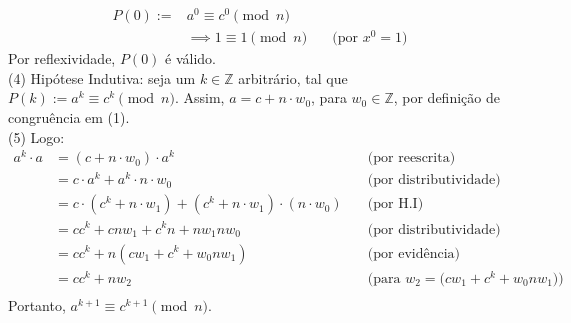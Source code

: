 \begin{enumerate}
\begin{align*}
				P(0) :=& a^0 \equiv c^0 \pmod{n} \\
				&\implies 1 \equiv 1 \pmod{n} &\quad \text{(por $x^0 = 1$)}
			\end{align*}
		Por reflexividade, $P(0)$ é válido. \\
		(4) Hipótese Indutiva: seja um $k \in \mathbb{Z}$ arbitrário, tal que $P(k):= a^k \equiv c^k \pmod{n}$. Assim, $a = c + n \cdot w_0$, para $w_0 \in \mathbb{Z}$, por definição de congruência em (1). \\
		(5) Logo: 
		\begin{align*}
			a^k \cdot a &= (c + n \cdot w_0) \cdot a^k &\quad \text{(por reescrita)} \\ 
			&= c \cdot a^k + a^k \cdot n \cdot w_0 &\quad \text{(por distributividade)} \\
			&= c \cdot (c^k + n \cdot w_1) + (c^k + n \cdot w_1) \cdot (n \cdot w_0) &\quad \text{(por H.I)} \\
			&= cc^k + cnw_1 + c^kn + nw_1nw_0 &\quad \text{(por distributividade)} \\
			&= cc^k + n(cw_1 + c^k + w_0nw_1) &\quad \text{(por evidência)} \\
			&= cc^k + nw_2 &\quad \text{(para $w_2 = (cw_1 + c^k + w_0nw_1$))} \\
		\end{align*}
		Portanto, $a^{k+1} \equiv c^{k+1} \pmod{n}$.
\end{enumerate}


